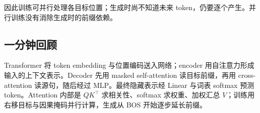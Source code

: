 因此训练可并行处理各目标位置；生成时尚不知道未来 token，仍要逐个产生。并行训练没有消除生成时的前缀依赖。

\subsection{一分钟回顾}

Transformer 将 token embedding 与位置编码送入网络；encoder 用自注意力形成输入的上下文表示。Decoder 先用 masked self-attention 读目标前缀，再用 cross-attention 读源句，随后经过 MLP。最终隐藏表示经 Linear 与词表 softmax 预测 token。Attention 内部是 $QK^\top$ 求相关性、softmax 求权重、加权汇总 $V$；训练用右移目标与因果掩码并行计算，生成从 BOS 开始逐步延长前缀。
